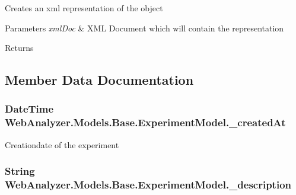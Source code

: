 Creates an xml representation of the object 


\begin{DoxyParams}{Parameters}
{\em xml\+Doc} & X\+M\+L Document which will contain the representation\\
\hline
\end{DoxyParams}
\begin{DoxyReturn}{Returns}

\end{DoxyReturn}


\subsection{Member Data Documentation}
\hypertarget{class_web_analyzer_1_1_models_1_1_base_1_1_experiment_model_a406cd5a0a10b170f9182492f493cc05a}{}
\subsubsection[{\+\_\+created\+At}]{\setlength{\rightskip}{0pt plus 5cm}Date\+Time Web\+Analyzer.\+Models.\+Base.\+Experiment\+Model.\+\_\+created\+At\hspace{0.3cm}{\ttfamily [private]}}\label{class_web_analyzer_1_1_models_1_1_base_1_1_experiment_model_a406cd5a0a10b170f9182492f493cc05a}


Creationdate of the experiment 

\hypertarget{class_web_analyzer_1_1_models_1_1_base_1_1_experiment_model_a55777bd2fa8b71c034d49baad38c6ea3}{}
\subsubsection[{\+\_\+description}]{\setlength{\rightskip}{0pt plus 5cm}String Web\+Analyzer.\+Models.\+Base.\+Experiment\+Model.\+\_\+description\hspace{0.3cm}{\ttfamily [private]}}\label{class_web_analyzer_1_1_models_1_1_base_1_1_experiment_model_a55777bd2fa8b71c034d49baad38c6ea3}



